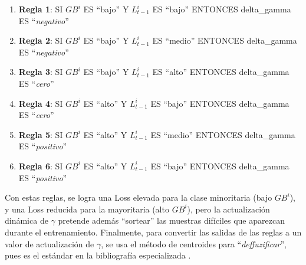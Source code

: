\begin{enumerate}
    \item \textbf{Regla 1}: SI $GB^i$ ES ``bajo'' Y $L^i_{t-1}$ ES ``bajo'' ENTONCES delta\_gamma ES ``\textit{negativo}''
    \item \textbf{Regla 2}: SI $GB^i$ ES ``bajo'' Y $L^i_{t-1}$ ES ``medio'' ENTONCES delta\_gamma ES ``\textit{negativo}''
    \item \textbf{Regla 3}: SI $GB^i$ ES ``bajo'' Y $L^i_{t-1}$ ES ``alto'' ENTONCES delta\_gamma ES ``\textit{cero}''
    \item \textbf{Regla 4}: SI $GB^i$ ES ``alto'' Y $L^i_{t-1}$ ES ``bajo'' ENTONCES delta\_gamma ES ``\textit{cero}''
    \item \textbf{Regla 5}: SI $GB^i$ ES ``alto'' Y $L^i_{t-1}$ ES ``medio'' ENTONCES delta\_gamma ES ``\textit{positivo}''
    \item \textbf{Regla 6}: SI $GB^i$ ES ``alto'' Y $L^i_{t-1}$ ES ``bajo'' ENTONCES delta\_gamma ES ``\textit{positivo}''
\end{enumerate}

Con estas reglas, se logra una Loss elevada para la clase minoritaria (bajo $GB^i$), y una Loss reducida para la mayoritaria (alto $GB^i$), pero la actualización dinámica de $\gamma$ pretende además ``sortear'' las muestras difíciles que aparezcan durante el entrenamiento. Finalmente, para convertir las salidas de las reglas a un valor de actualización de $\gamma$, se usa el método de centroides para ``\textit{deffuzificar}'', pues es el estándar en la bibliografía especializada \cite{patel2017classification,cho2020instance,liu2017fuzzy,Kiefner_FuzzyLogic_for_Python_2022}.



